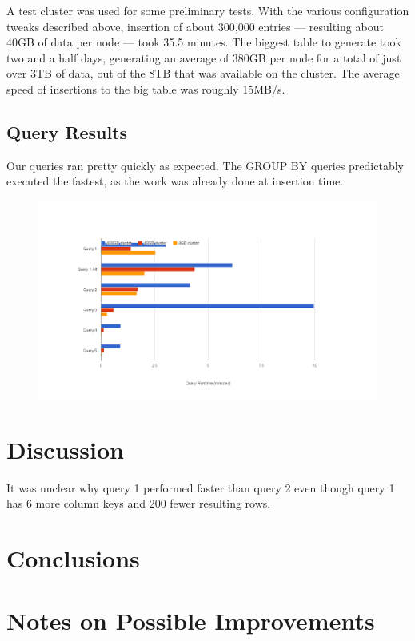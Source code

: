 \documentclass[letterpaper]{article}
\begin{document}
A test cluster was used for some preliminary tests. With the
various configuration tweaks described above, insertion of about 300,000
entries --- resulting about 40GB of data per node --- took 35.5 minutes.
The biggest table to generate took two and a half days, generating an average
of 380GB per node for a total of just over 3TB of data, out of the 8TB that was
available on the cluster. The average speed of insertions to the big table was
roughly 15MB/s. 

\subsection{Query Results}

Our queries ran pretty quickly as expected. The GROUP BY queries predictably executed the
fastest, as the work was already done at insertion time.
\begin{figure}[h]
	\centering
	\includegraphics{chart}
	\label{fig:Query Execution Times}
\end{figure}

\section{Discussion}
It was unclear why query 1 performed faster than query 2 even though query 1
has 6 more column keys and 200 fewer resulting rows. 

\section{Conclusions}

\section{Notes on Possible Improvements}
\end{document}
